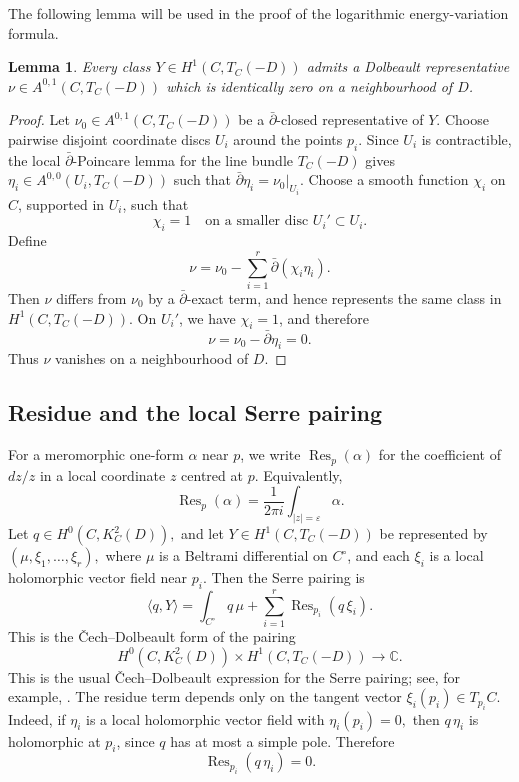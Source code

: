 \documentclass[11pt,reqno]{amsart}
\numberwithin{equation}{section}
\theoremstyle{plain}
\newtheorem{lemma}[theorem]{Lemma}
\theoremstyle{definition}
\theoremstyle{remark}
\begin{document}
The following lemma will be used in the proof of the logarithmic energy-variation
formula.

\begin{lemma}
\label{lem:vanishing-representative}
Every class
\(
        Y\in H^1(C,T_C(-D))
\)
admits a Dolbeault representative
\(
        \nu\in A^{0,1}(C,T_C(-D))
\)
which is identically zero on a neighbourhood of \(D\).
\end{lemma}

\begin{proof}
Let
\(
        \nu_0\in A^{0,1}(C,T_C(-D))
\)
be a \(\bar\partial\)-closed representative of \(Y\). Choose pairwise disjoint
coordinate discs \(U_i\) around the points \(p_i\). Since \(U_i\) is
contractible, the local \(\bar\partial\)-Poincare lemma for the line bundle
\(T_C(-D)\) gives
\(
        \eta_i\in A^{0,0}(U_i,T_C(-D))
\)
such that
\(
        \bar\partial\eta_i=\nu_0|_{U_i}.
\)
Choose a smooth function \(\chi_i\) on \(C\), supported in \(U_i\), such that
\[
        \chi_i=1
        \quad\text{on a smaller disc }U_i'\subset U_i.
\] Define
\[
        \nu
        =
        \nu_0-\sum_{i=1}^{r}\bar\partial(\chi_i\eta_i).
\]
Then \(\nu\) differs from \(\nu_0\) by a \(\bar\partial\)-exact term, and hence
represents the same class in \(H^1(C,T_C(-D))\).  On \(U_i'\), we have
\(\chi_i=1\), and therefore
\[
        \nu
        =
        \nu_0-\bar\partial\eta_i
        =
        0.
\]
Thus \(\nu\) vanishes on a neighbourhood of \(D\).
\end{proof}

\subsection{Residue and the local Serre pairing}

For a meromorphic one-form \(\alpha\) near \(p\), we write
\(
        \operatorname{Res}_{p}(\alpha)
\)
for the coefficient of \(dz/z\) in a local coordinate \(z\) centred at \(p\). Equivalently,
\[
        \operatorname{Res}_{p}(\alpha)
        =
        \frac{1}{2\pi i}
        \int_{|z|=\varepsilon}\alpha .
\]
Let
\(
        q\in H^0(C,K_C^2(D)),
\)
and let
\(
        Y\in H^1(C,T_C(-D))
\)
be represented by
\(
        (\mu,\xi_1,\ldots,\xi_r),
\)
where \(\mu\) is a Beltrami differential on \(C^\circ\), and each \(\xi_i\) is
a local holomorphic vector field near \(p_i\). Then the Serre pairing is
\begin{equation}
        \langle q,Y\rangle
        =
        \int_{C^\circ}q\,\mu
        +
        \sum_{i=1}^{r}
        \operatorname{Res}_{p_i}(q\,\xi_i).
        \label{eq:serre-local}
\end{equation}
This is the \v{C}ech--Dolbeault form of the pairing
\[
        H^0(C,K_C^2(D))\times H^1(C,T_C(-D))
        \longrightarrow
        \mathbb C.
\]
This is the usual \v{C}ech--Dolbeault expression for the Serre pairing; see,
for example, \cite[Ch.~2]{GriffithsHarris}.
The residue term depends only on the tangent vector
\(
        \xi_i(p_i)\in T_{p_i}C.
\)
Indeed, if \(\eta_i\) is a local holomorphic vector field with
\(
        \eta_i(p_i)=0,
\)
then \(q\,\eta_i\) is holomorphic at \(p_i\), since \(q\) has at most a simple
pole. Therefore
\[
        \operatorname{Res}_{p_i}(q\,\eta_i)=0.
\]
\end{document}
